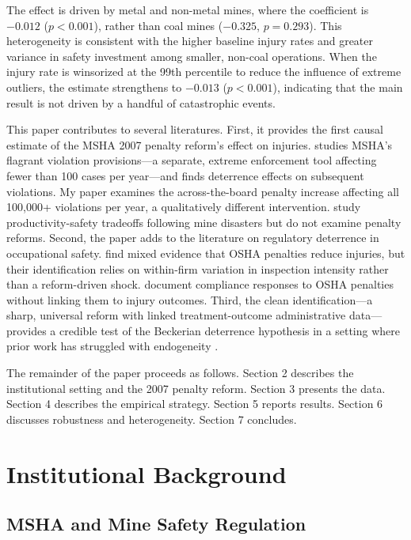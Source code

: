 \documentclass[12pt]{article}
\begin{document}
The effect is driven by metal and non-metal mines, where the coefficient is $-0.012$ ($p < 0.001$), rather than coal mines ($-0.325$, $p = 0.293$). This heterogeneity is consistent with the higher baseline injury rates and greater variance in safety investment among smaller, non-coal operations. When the injury rate is winsorized at the 99th percentile to reduce the influence of extreme outliers, the estimate strengthens to $-0.013$ ($p < 0.001$), indicating that the main result is not driven by a handful of catastrophic events.

This paper contributes to several literatures. First, it provides the first causal estimate of the MSHA 2007 penalty reform's effect on injuries. \citet{li2022enforcement} studies MSHA's flagrant violation provisions---a separate, extreme enforcement tool affecting fewer than 100 cases per year---and finds deterrence effects on subsequent violations. My paper examines the across-the-board penalty increase affecting all 100,000+ violations per year, a qualitatively different intervention. \citet{gowrisankaran2015productivity} study productivity-safety tradeoffs following mine disasters but do not examine penalty reforms. Second, the paper adds to the literature on regulatory deterrence in occupational safety. \citet{gray2005effectiveness} find mixed evidence that OSHA penalties reduce injuries, but their identification relies on within-firm variation in inspection intensity rather than a reform-driven shock. \citet{ko2010deterrent} document compliance responses to OSHA penalties without linking them to injury outcomes. Third, the clean identification---a sharp, universal reform with linked treatment-outcome administrative data---provides a credible test of the Beckerian deterrence hypothesis in a setting where prior work has struggled with endogeneity \citep{viscusi1986impact, scholz1997compliance, shimshack2007enforce}.

The remainder of the paper proceeds as follows. Section 2 describes the institutional setting and the 2007 penalty reform. Section 3 presents the data. Section 4 describes the empirical strategy. Section 5 reports results. Section 6 discusses robustness and heterogeneity. Section 7 concludes.


\section{Institutional Background}

\subsection{MSHA and Mine Safety Regulation}
\end{document}
